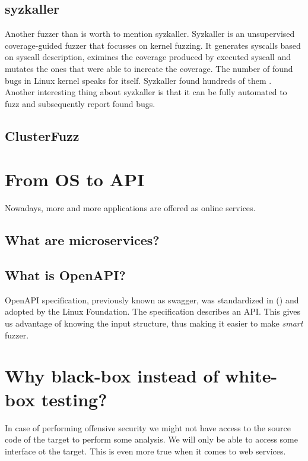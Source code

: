 \subsection{syzkaller}
Another fuzzer than is worth to mention syzkaller. Syzkaller is an unsupervised coverage-guided fuzzer that focusses on kernel fuzzing. It generates syscalls based on syscall description, eximines the coverage produced by executed syscall and mutates the ones that were able to increate the coverage. The number of found bugs in Linux kernel speaks for itself. Syzkaller found hundreds of them \cite{syzkaller2020bugs}. Another interesting thing about syzkaller is that it can be fully automated to fuzz and subsequently report found bugs.


\subsection{ClusterFuzz}


\section{From OS to API}
Nowadays, more and more applications are offered as online services.

\subsection{What are microservices?}

\subsection{What is OpenAPI?}
OpenAPI specification, previously known as swagger, was standardized in () and adopted by the Linux Foundation. The specification describes an API. This gives us advantage of knowing the input structure, thus making it easier to make \emph{smart} fuzzer.

\section{Why black-box instead of white-box testing?}
In case of performing offensive security we might not have access to the source code of the target to perform some analysis. We will only be able to access some interface ot the target. This is even more true when it comes to web services.
